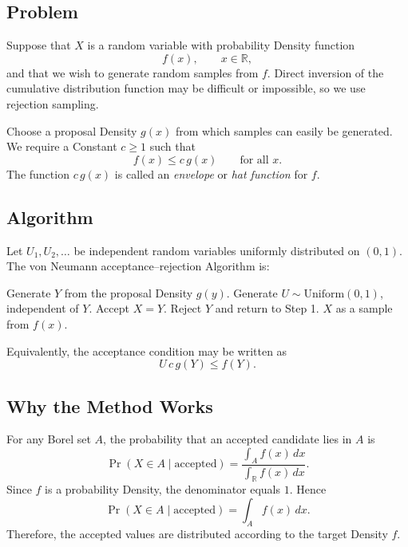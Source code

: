 \documentclass[a4paper, 10pt, onepage]{elegantbook}
\begin{document}
{\subsection{Problem}

\noindent

Suppose that \(X\) is a random variable with probability Density function
\[
f(x), \qquad x\in\mathbb{R},
\]
and that we wish to generate random samples from \(f\). Direct inversion of
the cumulative distribution function may be difficult or impossible, so we
use rejection sampling.

Choose a proposal Density \(g(x)\) from which samples can easily be
generated. We require a Constant \(c\geq1\) such that
\[
f(x)\leq c\,g(x)
\qquad\text{for all }x.
\]
The function \(c\,g(x)\) is called an \emph{envelope} or \emph{hat function}
for \(f\).

\subsection{Algorithm}

\noindent

Let \(U_1,U_2,\ldots\) be independent random variables uniformly distributed
on \((0,1)\). The von Neumann acceptance--rejection Algorithm is:

\begin{algorithm}[H]
\caption{von Neumann acceptance--rejection method}
\begin{algorithmic}[1]
\State Generate \(Y\) from the proposal Density \(g(y)\).
\State Generate \(U\sim\mathrm{Uniform}(0,1)\), independent of \(Y\).
    \State Accept \(X=Y\).
\Else
    \State Reject \(Y\) and return to Step 1.
\EndIf
\State \Return \(X\) as a sample from \(f(x)\).
\end{algorithmic}
\end{algorithm}

Equivalently, the acceptance condition may be written as
\[
U\,c\,g(Y)\leq f(Y).
\]

\subsection{Why the Method Works}

\noindent

For any Borel set \(A\), the probability that an accepted candidate lies in
\(A\) is
\[
\Pr(X\in A\mid \text{accepted})
=
\frac{\displaystyle\int_A f(x)\,dx}
{\displaystyle\int_{\mathbb{R}} f(x)\,dx}.
\]
Since \(f\) is a probability Density, the denominator equals \(1\). Hence
\[
\Pr(X\in A\mid \text{accepted})
=
\int_A f(x)\,dx.
\]
Therefore, the accepted values are distributed according to the target
Density \(f\).

}
\end{document}
